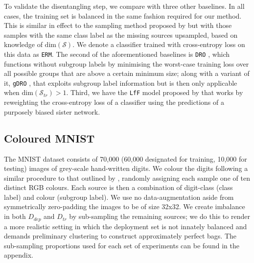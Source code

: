 To validate the disentangling step, we compare with three other baselines.
In all cases, the training set is balanced in the same fashion required for our method.
This is similar in effect to the sampling method proposed by \citet{kamiran2012data} but with those samples with the same class label as the missing sources upsampled, based on knowledge of $\text{dim}(\mathcal{S})$.
We denote a classifier trained with cross-entropy loss on this data as \texttt{ERM}.
The second of the aforementioned baselines is \texttt{DRO} \citep{HasSriNamLia18}, which functions without subgroup labels by minimising the worst-case training loss over all possible groups that are above a certain minimum size;
along with a variant of it, \texttt{gDRO} \citep{sagawa2019distributionally}, that exploits subgroup label information but is then only applicable when $\text{dim}(\mathcal{S}_{tr}) > 1$.
Third, we have the \texttt{LfF} model proposed by \citet{nam2020learning} that works by reweighting the cross-entropy loss of a classifier using the predictions of a purposely biased sister network.

%
%
\subsection{Coloured MNIST}
The MNIST dataset \citep{lecun1998gradient} consists of 70,000 (60,000 designated for training, 10,000 for testing) images of grey-scale hand-written digits. We colour the digits following a similar procedure to that outlined by \citep{kim2019learning}, randomly assigning each sample one of ten distinct RGB colours. Each source is then a combination of digit-class (class label) and colour (subgroup label). We use no data-augmentation aside from symmetrically zero-padding the images to be of size 32x32.
We create imbalance in both $D_{dep}$ and $D_{tr}$ by sub-sampling the remaining sources;
we do this to render a more realistic setting in which the deployment set is not innately balanced and demands preliminary clustering to construct approximately perfect bags. The sub-sampling proportions used for each set of experiments can be found in the appendix.

